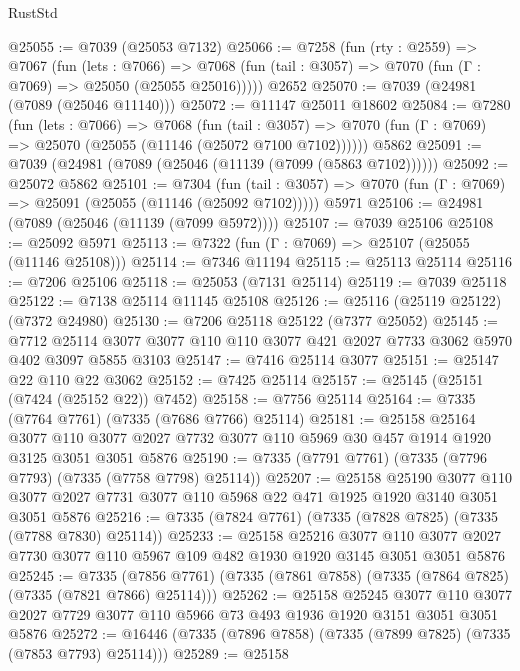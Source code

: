 \begin{lexlean}{RustStd}
\begin{coremodule}
@25055 := @7039 (@25053 @7132)
@25066 := @7258
    (fun (rty : @2559) =>
    @7067
      (fun (lets : @7066) =>
      @7068 (fun (tail : @3057) => @7070 (fun (Γ : @7069) => @25050 (@25055 @25016)))))
    @2652
@25070 := @7039 (@24981 (@7089 (@25046 @11140)))
@25072 := @11147 @25011 @18602
@25084 := @7280
    (fun (lets : @7066) =>
    @7068
      (fun (tail : @3057) =>
      @7070 (fun (Γ : @7069) => @25070 (@25055 (@11146 (@25072 @7100 @7102))))))
    @5862
@25091 := @7039 (@24981 (@7089 (@25046 (@11139 (@7099 (@5863 @7102))))))
@25092 := @25072 @5862
@25101 := @7304
    (fun (tail : @3057) => @7070 (fun (Γ : @7069) => @25091 (@25055 (@11146 (@25092 @7102)))))
    @5971
@25106 := @24981 (@7089 (@25046 (@11139 (@7099 @5972))))
@25107 := @7039 @25106
@25108 := @25092 @5971
@25113 := @7322 (fun (Γ : @7069) => @25107 (@25055 (@11146 @25108)))
@25114 := @7346 @11194
@25115 := @25113 @25114
@25116 := @7206 @25106
@25118 := @25053 (@7131 @25114)
@25119 := @7039 @25118
@25122 := @7138 @25114 @11145 @25108
@25126 := @25116 (@25119 @25122) (@7372 @24980)
@25130 := @7206 @25118 @25122 (@7377 @25052)
@25145 := @7712
    @25114
    @3077
    @3077
    @110
    @110
    @3077
    @421
    @2027
    @7733
    @3062
    @5970
    @402
    @3097
    @5855
    @3103
@25147 := @7416 @25114 @3077
@25151 := @25147 @22 @110 @22 @3062
@25152 := @7425 @25114
@25157 := @25145 (@25151 (@7424 (@25152 @22)) @7452)
@25158 := @7756 @25114
@25164 := @7335 (@7764 @7761) (@7335 (@7686 @7766) @25114)
@25181 := @25158
    @25164
    @3077
    @110
    @3077
    @2027
    @7732
    @3077
    @110
    @5969
    @30
    @457
    @1914
    @1920
    @3125
    @3051
    @3051
    @5876
@25190 := @7335 (@7791 @7761) (@7335 (@7796 @7793) (@7335 (@7758 @7798) @25114))
@25207 := @25158
    @25190
    @3077
    @110
    @3077
    @2027
    @7731
    @3077
    @110
    @5968
    @22
    @471
    @1925
    @1920
    @3140
    @3051
    @3051
    @5876
@25216 := @7335 (@7824 @7761) (@7335 (@7828 @7825) (@7335 (@7788 @7830) @25114))
@25233 := @25158
    @25216
    @3077
    @110
    @3077
    @2027
    @7730
    @3077
    @110
    @5967
    @109
    @482
    @1930
    @1920
    @3145
    @3051
    @3051
    @5876
@25245 := @7335
    (@7856 @7761)
    (@7335 (@7861 @7858) (@7335 (@7864 @7825) (@7335 (@7821 @7866) @25114)))
@25262 := @25158
    @25245
    @3077
    @110
    @3077
    @2027
    @7729
    @3077
    @110
    @5966
    @73
    @493
    @1936
    @1920
    @3151
    @3051
    @3051
    @5876
@25272 := @16446 (@7335 (@7896 @7858) (@7335 (@7899 @7825) (@7335 (@7853 @7793) @25114)))
@25289 := @25158

\end{coremodule}
\end{lexlean}
